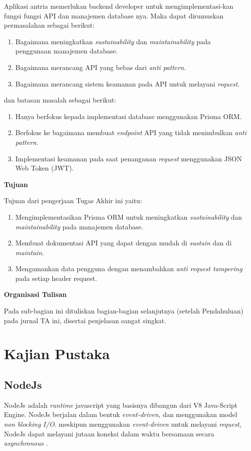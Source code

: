 Aplikasi antria memerlukan backend developer untuk mengimplementasi-kan fungsi fungsi API dan manajemen database nya. Maka dapat dirumuskan permasalahan sebagai berikut:
\begin{enumerate}
  \item Bagaimana meningkatkan \textit{sustainability} dan \textit{maintainability} pada penggunaan manajemen database.
  \item Bagaimana merancang API yang bebas dari \textit{anti pattern}.
  \item Bagaimana merancang sistem keamanan pada API untuk melayani \textit{request}.
\end{enumerate}
dan batasan masalah sebagai berikut:
\begin{enumerate}
  \item Hanya berfokus kepada implementasi database menggunakan Prisma ORM.
  \item Berfokus ke bagaimana membuat \textit{endpoint} API yang tidak menimbulkan \textit{anti pattern}.
  \item Implementasi keamanan pada saat penanganan \textit{request} menggunakan JSON Web Token (JWT).
\end{enumerate}


\noindent\textbf{Tujuan}

Tujuan dari pengerjaan Tugas Akhir ini yaitu:
\begin{enumerate}
  \item Mengimplementasikan Prisma ORM untuk meningkatkan \textit{sustainability} dan \textit{maintainability} pada manajemen database.
  \item Membuat dokumentasi API yang dapat dengan mudah di \textit{sustain} dan di \textit{maintain}.
  \item Mengamankan data pengguna dengan menambahkan \textit{anti request tampering} pada setiap header request.
  
\end{enumerate}

\noindent \textbf{Organisasi Tulisan}

Pada sub-bagian ini dituliskan bagian-bagian selanjutnya (setelah Pendahuluan) pada jurnal TA ini, disertai penjelasan sangat singkat.

\section{Kajian Pustaka}
\subsection{NodeJs}
NodeJs adalah \textit{runtime} javascript yang basisnya dibangun dari V8 Java-Script Engine. NodeJs berjalan dalam bentuk \textit{event-driven}, dan menggunakan model \textit{non blocking I/O}. meskipun menggunakan \textit{event-driven} untuk melayani \textit{request}, NodeJs dapat melayani jutaan koneksi dalam waktu bersamaan secara \textit{asynchronous} \cite{shah2017node}.

